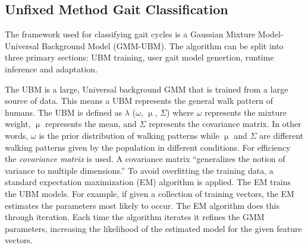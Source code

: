 \documentclass{sig-alternate}
\begin{document}
	

\subsection{Unfixed Method Gait Classification}
The framework used for classifying gait cycles is a Gaussian Mixture Model-Universal Background Model (GMM-UBM). The algorithm can be split into three primary sections: UBM training, user gait model genertion, runtime inference and adaptation. 

	 The UBM is a large, Universal background GMM that is trained from a large source of data. This means a UBM represents the general walk pattern of humans. The UBM is defined as 
\begin{math} \lambda \end{math} (\begin{math} \omega \end{math},
\begin{math} \upmu \end{math},
\begin{math} \Sigma \end{math}) where
\begin{math} \omega \end{math} represents the mixture weight, \begin{math} \upmu \end{math} represents the mean, and \begin{math} \Sigma \end{math} represents the covariance matrix. In other words, \begin{math} \omega \end{math} is the prior distribution of walking patterns while \begin{math} \upmu \end{math} and \begin{math} \Sigma \end{math} are different walking patterns given by the population in different conditions. For efficiency the \textit{covariance matrix} is used. A covariance matrix ``generalizes the notion of variance to multiple dimensions.''\cite{Lu:2014} To avoid overfitting the training data, a standard expectation maximization (EM) algorithm is applied. The EM trains the UBM models. For example, if given a collection of training vectors, the EM estimates the parameters most likely to occur. The EM algorithm does this through iteration. Each time the algorithm iterates it refines the GMM parameters, increasing the likelihood of the estimated model for the given feature vectors. 
\end{document}
